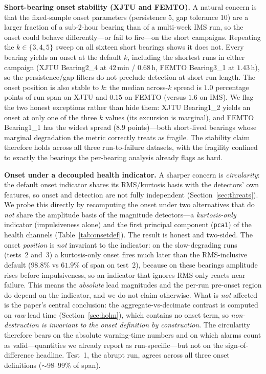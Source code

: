 \documentclass[journal]{IEEEtran}
\begin{document}
\textbf{Short-bearing onset stability (XJTU and FEMTO).} A natural concern is
that the fixed-sample onset parameters (persistence 5, gap tolerance 10) are a
larger fraction of a sub-2-hour bearing than of a multi-week IMS run, so the onset
could behave differently---or fail to fire---on the short campaigns. Repeating the
$k\in\{3,4,5\}$ sweep on all sixteen short bearings shows it does not. Every
bearing yields an onset at the default $k$, including the shortest runs in either
campaign (XJTU Bearing2\_4 at $42$\,min / $0.68$\,h, FEMTO Bearing3\_1 at
$1.43$\,h), so the persistence/gap filters do not preclude detection at short run
length. The onset position is also stable to $k$: the median across-$k$ spread is
$1.0$ percentage points of run span on XJTU and $0.15$ on FEMTO (versus $1.6$ on
IMS). We flag the two honest exceptions rather than hide them: XJTU Bearing1\_2
yields an onset at only one of the three $k$ values (its excursion is marginal),
and FEMTO Bearing1\_1 has the widest spread ($8.9$ points)---both short-lived
bearings whose marginal degradation the metric correctly treats as fragile. The
stability claim therefore holds across all three run-to-failure datasets, with the
fragility confined to exactly the bearings the per-bearing analysis already flags
as hard.

\textbf{Onset under a decoupled health indicator.} A sharper concern is
\emph{circularity}: the default onset indicator shares its RMS/kurtosis basis with the
detectors' own features, so onset and detection are not fully independent
(Section~\ref{sec:threats}). We probe this directly by recomputing the onset under two
alternatives that do \emph{not} share the amplitude basis of the magnitude
detectors---a \emph{kurtosis-only} indicator (impulsiveness alone) and the first
principal component (\texttt{pca1}) of the health channels
(Table~\ref{tab:onsetdef}). The result is honest and two-sided. The onset
\emph{position} is \emph{not} invariant to the indicator: on the slow-degrading runs
(tests~2 and~3) a kurtosis-only onset fires much later than the RMS-inclusive default
($98.8\%$ vs $61.9\%$ of span on test~2), because on these bearings amplitude rises
before impulsiveness, so an indicator that ignores RMS only reacts near failure. This
means the \emph{absolute} lead magnitudes and the per-run pre-onset region do depend on
the indicator, and we do not claim otherwise. What is \emph{not} affected is the
paper's central conclusion: the aggregate-vs-decimate contrast is computed on
\emph{raw} lead time (Section~\ref{sec:holm}), which contains no onset term, so
\emph{non-destruction is invariant to the onset definition by construction}. The
circularity therefore bears on the absolute warning-time numbers and on which alarms
count as valid---quantities we already report as run-specific---but not on the
sign-of-difference headline. Test~1, the abrupt run, agrees across all three onset
definitions ($\sim$98--99\% of span).
\end{document}
